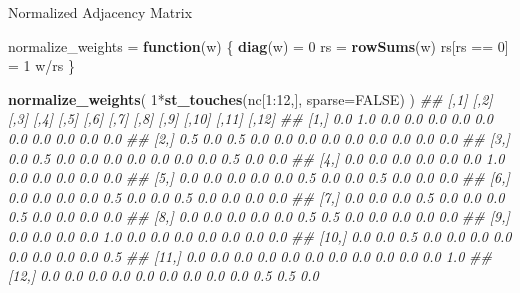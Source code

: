 \documentclass[11pt,ignorenonframetext,]{beamer}
\newenvironment{Shaded}{}{}
\newcommand{\CommentTok}[1]{\textcolor[rgb]{0.38,0.63,0.69}{\textit{#1}}}
\newcommand{\ControlFlowTok}[1]{\textcolor[rgb]{0.00,0.44,0.13}{\textbf{#1}}}
\newcommand{\DataTypeTok}[1]{\textcolor[rgb]{0.56,0.13,0.00}{#1}}
\newcommand{\DecValTok}[1]{\textcolor[rgb]{0.25,0.63,0.44}{#1}}
\newcommand{\KeywordTok}[1]{\textcolor[rgb]{0.00,0.44,0.13}{\textbf{#1}}}
\newcommand{\NormalTok}[1]{#1}
\newcommand{\OperatorTok}[1]{\textcolor[rgb]{0.40,0.40,0.40}{#1}}
\newcommand{\OtherTok}[1]{\textcolor[rgb]{0.00,0.44,0.13}{#1}}
\newcommand{\StringTok}[1]{\textcolor[rgb]{0.25,0.44,0.63}{#1}}
\let\oldShaded\Shaded
\let\endoldShaded\endShaded
\renewenvironment{Shaded}{\footnotesize\begin{spacing}{0.9}\oldShaded}{\endoldShaded\end{spacing}}
\let\oldverbatim\verbatim
\let\endoldverbatim\endverbatim
\newcommand{\scriptoutput}{
  \renewenvironment{Shaded}{\scriptsize\begin{spacing}{0.9}\oldShaded}{\endoldShaded\end{spacing}}
  \renewenvironment{verbatim}{\scriptsize\begin{spacing}{0.9}\oldverbatim}{\endoldverbatim\end{spacing}}
}
\begin{document}
\begin{frame}[fragile,t]{Normalized Adjacency Matrix}
\protect\hypertarget{normalized-adjacency-matrix}{}

\scriptoutput

\begin{Shaded}
\begin{Highlighting}[]
\NormalTok{normalize_weights =}\StringTok{ }\ControlFlowTok{function}\NormalTok{(w) \{}
  \KeywordTok{diag}\NormalTok{(w) =}\StringTok{ }\DecValTok{0}
\NormalTok{  rs =}\StringTok{ }\KeywordTok{rowSums}\NormalTok{(w)}
\NormalTok{  rs[rs }\OperatorTok{==}\StringTok{ }\DecValTok{0}\NormalTok{] =}\StringTok{ }\DecValTok{1}
\NormalTok{  w}\OperatorTok{/}\NormalTok{rs}
\NormalTok{\}}

\KeywordTok{normalize_weights}\NormalTok{( }\DecValTok{1}\OperatorTok{*}\KeywordTok{st_touches}\NormalTok{(nc[}\DecValTok{1}\OperatorTok{:}\DecValTok{12}\NormalTok{,], }\DataTypeTok{sparse=}\OtherTok{FALSE}\NormalTok{) )}
\CommentTok{##       [,1] [,2] [,3] [,4] [,5] [,6] [,7] [,8] [,9] [,10] [,11] [,12]}
\CommentTok{##  [1,]  0.0  1.0  0.0  0.0  0.0  0.0  0.0  0.0  0.0   0.0   0.0   0.0}
\CommentTok{##  [2,]  0.5  0.0  0.5  0.0  0.0  0.0  0.0  0.0  0.0   0.0   0.0   0.0}
\CommentTok{##  [3,]  0.0  0.5  0.0  0.0  0.0  0.0  0.0  0.0  0.0   0.5   0.0   0.0}
\CommentTok{##  [4,]  0.0  0.0  0.0  0.0  0.0  0.0  1.0  0.0  0.0   0.0   0.0   0.0}
\CommentTok{##  [5,]  0.0  0.0  0.0  0.0  0.0  0.5  0.0  0.0  0.5   0.0   0.0   0.0}
\CommentTok{##  [6,]  0.0  0.0  0.0  0.0  0.5  0.0  0.0  0.5  0.0   0.0   0.0   0.0}
\CommentTok{##  [7,]  0.0  0.0  0.0  0.5  0.0  0.0  0.0  0.5  0.0   0.0   0.0   0.0}
\CommentTok{##  [8,]  0.0  0.0  0.0  0.0  0.0  0.5  0.5  0.0  0.0   0.0   0.0   0.0}
\CommentTok{##  [9,]  0.0  0.0  0.0  0.0  1.0  0.0  0.0  0.0  0.0   0.0   0.0   0.0}
\CommentTok{## [10,]  0.0  0.0  0.5  0.0  0.0  0.0  0.0  0.0  0.0   0.0   0.0   0.5}
\CommentTok{## [11,]  0.0  0.0  0.0  0.0  0.0  0.0  0.0  0.0  0.0   0.0   0.0   1.0}
\CommentTok{## [12,]  0.0  0.0  0.0  0.0  0.0  0.0  0.0  0.0  0.0   0.5   0.5   0.0}
\end{Highlighting}
\end{Shaded}

\end{frame}
\end{document}
